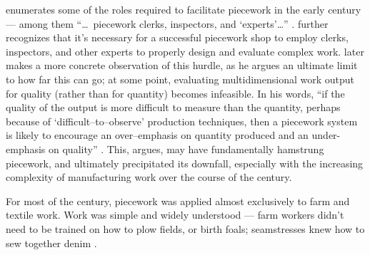 \documentclass[trackingWork]{subfiles}
\begin{document}
\citeauthor{10.2307/23702539} enumerates some of the roles required
to facilitate piecework in the early  century --- among them
    ``\dots~piecework clerks, inspectors, and `experts'\dots''
\cite{10.2307/23702539}.
\citeauthor{10.2307/23702539} further recognizes that
it's necessary for a successful piecework shop to employ
clerks,
inspectors, and
other experts to properly design and evaluate complex work.
\citeauthor{hart2016rise} later makes a more concrete observation of this hurdle,
as he argues an ultimate limit to how far this can go;
at some point, evaluating multidimensional work output for quality
(rather than for quantity) becomes infeasible.
In his words,
``if the quality of the output is more difficult to measure than the quantity,
perhaps because of `difficult--to--observe' production techniques,
then a piecework system is likely to encourage
an over--emphasis on quantity produced and an under-emphasis on quality''
\cite{hart2016rise}.
This, \citeauthor{hart2016rise} argues, may have fundamentally hamstrung piecework,
and ultimately precipitated its downfall,
especially with the increasing complexity of manufacturing work
over the course of the  century.

For most of the  century,
piecework was applied almost exclusively to farm and textile work.
Work was simple and widely understood
--- farm workers didn't need to be trained on how to plow fields, or birth foals;
seamstresses knew how to sew together denim
\cite{10.2307/2338394,riisOtherSideLives}.
\end{document}
